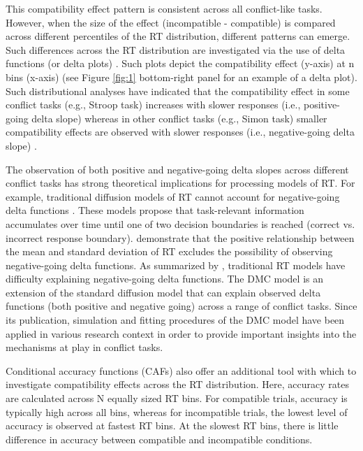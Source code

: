 This compatibility effect pattern is consistent across all conflict-like tasks.
However, when the size of the effect (incompatible - compatible) is compared
across different percentiles of the RT distribution, different patterns can
emerge. Such differences across the RT distribution are investigated via the
use of delta functions (or delta plots) \parencite{de1994conditional,
speckman2008delta}.  Such plots depict the compatibility effect (y-axis) at n
bins (x-axis) (see Figure \ref{fig:1} bottom-right panel for an example of a
delta plot). Such distributional analyses have indicated that the compatibility
effect in some conflict tasks (e.g., Stroop task) increases with slower
responses (i.e., positive-going delta slope) whereas in other conflict tasks
(e.g., Simon task) smaller compatibility effects are observed with slower
responses (i.e., negative-going delta slope) \parencite[see][for Stroop and
Simon tasks]{pratte2010exploring}.

The observation of both positive and negative-going delta slopes across
different conflict tasks has strong theoretical implications for processing
models of RT. For example, traditional diffusion models of RT cannot account
for negative-going delta functions \parencite{pratte2010exploring}. These
models propose that task-relevant information accumulates over time until one
of two decision boundaries is reached (correct vs. incorrect response
boundary). \textcite{wagenmakers2007linear} demonstrate that the positive
relationship between the mean and standard deviation of RT excludes the
possibility of observing negative-going delta functions. As summarized by
\textcite{ulrich2015automatic}, traditional RT models have difficulty
explaining negative-going delta functions. The DMC model is an extension of the
standard diffusion model that can explain observed delta functions (both
positive and negative going) across a range of conflict tasks. Since its
publication, simulation and fitting procedures of the DMC model have been
applied in various research context in order to provide important insights into
the mechanisms at play in conflict tasks\parencite[e.g.,][]{servant2016,
mittelstadt2020beyond}.

Conditional accuracy functions (CAFs) also offer an additional tool with which
to investigate compatibility effects across the RT distribution. Here, accuracy
rates are calculated across N equally sized RT bins. For compatible trials,
accuracy is typically high across all bins, whereas for incompatible trials,
the lowest level of accuracy is observed at fastest RT bins. At the slowest RT
bins, there is little difference in accuracy between compatible and
incompatible conditions.

